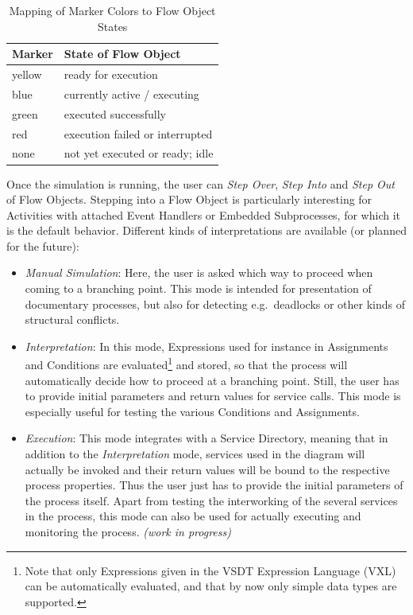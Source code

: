 \begin{table}[ht]
	\centering
	\caption{Mapping of Marker Colors to Flow Object States}
	\begin{tabular}{l|l}
		\bf Marker & \bf State of Flow Object       \\
		\hline
		yellow    & ready for execution             \\
		blue      & currently active / executing    \\
		green     & executed successfully           \\
		red       & execution failed or interrupted \\
		none      & not yet executed or ready; idle \\
	\end{tabular}
	\label{tab:markerColors}
\end{table}

Once the simulation is running, the user can \emph{Step Over}, \emph{Step Into}
and \emph{Step Out} of Flow Objects.  Stepping into a Flow Object is particularly
interesting for Activities with attached Event Handlers or Embedded Subprocesses,
for which it is the default behavior.  Different kinds of interpretations are
available (or planned for the future):
\begin{itemize}
	\item \emph{Manual Simulation}: Here, the user is asked which way to proceed
	when coming to a branching point.  This mode is intended for presentation of
	documentary processes, but also for detecting e.g.\ deadlocks or other kinds
	of structural conflicts.
	
	\item \emph{Interpretation}: In this mode, Expressions used for instance in
	Assignments and Conditions are evaluated\footnote{Note that only Expressions
	given in the VSDT Expression Language (VXL) can be automatically evaluated,
	and that by now only simple data types are supported.} and stored, so that
	the process will automatically decide how to proceed at a branching point.
	Still, the user has to provide initial parameters and return values for
	service calls.  This mode is especially useful for testing the various
	Conditions and Assignments.
	
	\item \emph{Execution}: This mode integrates with a Service Directory, meaning
	that in addition to the \emph{Interpretation} mode, services used in the
	diagram will actually be invoked and their return values will be bound to the
	respective process properties.  Thus the user just has to provide the initial
	parameters of the process itself.  Apart from testing the interworking of the
	several services in the process, this mode can also be used for actually
	executing and monitoring the process. \emph{(work in progress)}
\end{itemize}


